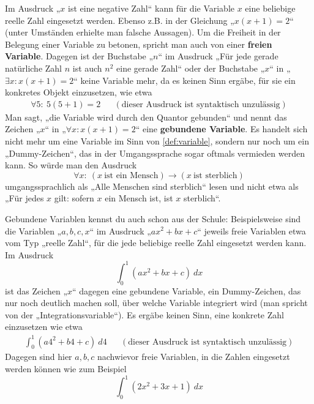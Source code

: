 \begin{bem} \label{gebundenevariable}  
    Im Ausdruck „$x$ ist eine negative Zahl“ kann für die Variable $x$ eine beliebige reelle Zahl eingesetzt werden. Ebenso z.B. in der Gleichung „$x(x+1)=2$“ (unter Umständen erhielte man falsche Aussagen). Um die Freiheit in der Belegung einer Variable zu betonen, spricht man auch von einer \textbf{freien Variable}. Dagegen ist der Buchstabe „$n$“ im Ausdruck „Für jede gerade natürliche Zahl $n$ ist auch $n^2$ eine gerade Zahl“ oder der Buchstabe „$x$“ in „$\exists x: x(x+1)=2$“ keine Variable mehr, da es keinen Sinn ergäbe, für sie ein konkretes Objekt einzusetzen, wie etwa
    \begin{align*}
        \forall 5:\ 5(5+1) = 2 && (\text{dieser Ausdruck ist syntaktisch unzulässig})
    \end{align*}
    Man sagt, „die Variable wird durch den Quantor gebunden“ und nennt das Zeichen „$x$“ in „$\forall x: x(x+1)=2$“ eine \textbf{gebundene Variable}. Es handelt sich nicht mehr um eine Variable im Sinn von \cref{def:variable}, sondern nur noch um ein „Dummy-Zeichen“, das in der Umgangssprache sogar oftmals vermieden werden kann. So würde man den Ausdruck
        \[ \forall x:\ (x\ \text{ist ein Mensch})\to (x\ \text{ist sterblich}) \]
    umgangssprachlich als „Alle Menschen sind sterblich“ lesen und nicht etwa als „Für jedes $x$ gilt: sofern $x$ ein Mensch ist, ist $x$ sterblich“.
    
    Gebundene Variablen kennst du auch schon aus der Schule: Beispielsweise sind die Variablen „$a,b,c,x$“ im Ausdruck „$ax^2 +bx+c$“ jeweils freie Variablen etwa vom Typ „reelle Zahl“, für die jede beliebige reelle Zahl eingesetzt werden kann. Im Ausdruck
        \[ \int_0^1 (ax^2+bx+c)\ dx \]
    ist das Zeichen „$x$“ dagegen eine gebundene Variable, ein Dummy-Zeichen, das nur noch deutlich machen soll, über welche Variable integriert wird (man spricht von der „Integrationsvariable“). Es ergäbe keinen Sinn, eine konkrete Zahl einzusetzen wie etwa
    \begin{align*}
        \int_0^1 (a4^2+b4+c)\ d4 && (\text{dieser Ausdruck ist syntaktisch unzulässig})
    \end{align*}
    Dagegen sind hier $a,b,c$ nachwievor freie Variablen, in die Zahlen eingesetzt werden können wie zum Beispiel
        \[ \int_0^1 (2x^2+3x+1)\ dx\]
\end{bem}


